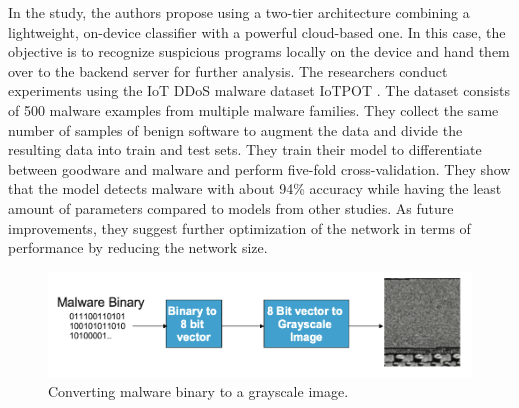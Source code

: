 \documentclass[conference, 11pt]{IEEEtran}
\begin{document}
    In the study, the authors propose using a two-tier architecture combining a lightweight, on-device classifier with a powerful cloud-based one.
    In this case, the objective is to recognize suspicious programs locally on the device and hand them over to the backend server for further analysis.
    The researchers conduct experiments using the IoT DDoS malware dataset IoTPOT \cite{IoTPOT}.
    The dataset consists of 500 malware examples from multiple malware families.
    They collect the same number of samples of benign software to augment the data and divide the resulting data into train and test sets.
    They train their model to differentiate between goodware and malware and perform five-fold cross-validation.
    They show that the model detects malware with about 94\% accuracy while having the least amount of parameters compared to models from other studies.
    As future improvements, they suggest further optimization of the network in terms of performance by reducing the network size.

    \begin{figure}[htbp]
        \centerline{\includegraphics[width=\linewidth]{figures/malware-to-gray.png}}
        \caption{Converting malware binary to a grayscale image.}
        \label{fig1}
    \end{figure}
\end{document}
